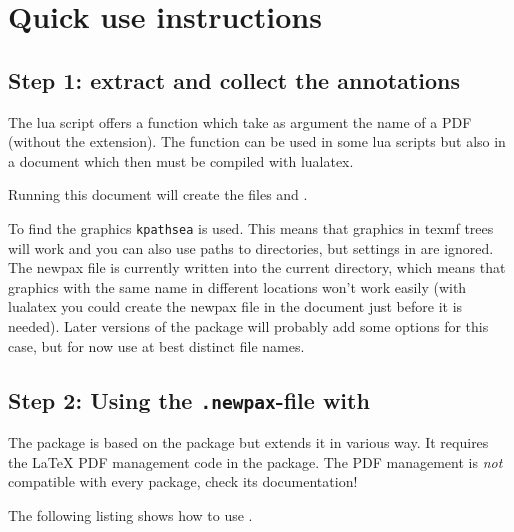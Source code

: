 \documentclass[DIV=12,parskip=half-,bibliography=totoc]{scrartcl}
\begin{document}
\section{Quick use instructions}

\subsection{Step 1: extract and collect the annotations}

The lua script offers a function which take as argument the name of a PDF (without the extension).
The function can be used in some lua scripts but also in a document which then must be compiled
with lualatex.



Running this document will create the files  and .

To find the graphics \texttt{kpathsea} is used. This means that graphics in texmf trees will work and
you can also use paths to directories, but settings in  are ignored. The newpax
file is currently written into the current directory, which means that graphics with the same name
in different locations won't work easily (with lualatex you could create the newpax file in the document
just before it is needed). Later versions of the package will probably add some options for this case,
but for now use at best distinct file names.


\subsection{Step 2: Using the \texttt{.newpax}-file with \texorpdfstring{}{newpax}}

The package  is based on the package  but extends it in various way.
It requires the \LaTeX{} PDF management
code in the  package. The PDF management is \emph{not} compatible with every package, check its documentation!

The following listing shows how to use .
\end{document}
